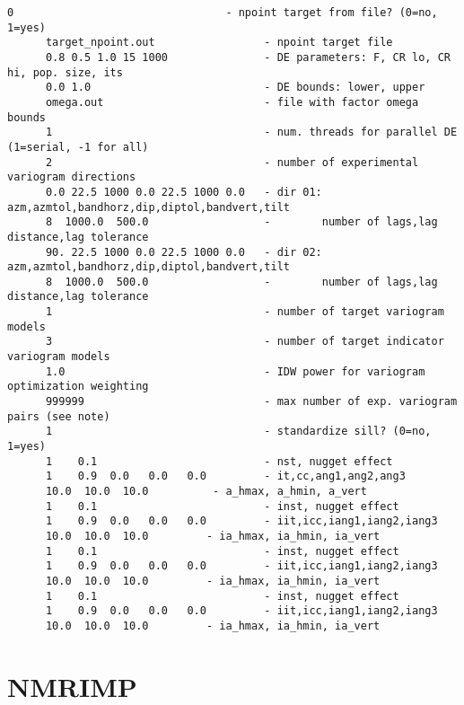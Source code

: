 \begin{framed}
\begin{lstlisting}[style=ccgParameterfile]
      0                                 - npoint target from file? (0=no, 1=yes)
      target_npoint.out                 - npoint target file
      0.8 0.5 1.0 15 1000               - DE parameters: F, CR lo, CR hi, pop. size, its
      0.0 1.0                           - DE bounds: lower, upper
      omega.out                         - file with factor omega bounds
      1                                 - num. threads for parallel DE (1=serial, -1 for all)
      2                                 - number of experimental variogram directions
      0.0 22.5 1000 0.0 22.5 1000 0.0   - dir 01: azm,azmtol,bandhorz,dip,diptol,bandvert,tilt
      8  1000.0  500.0                  -        number of lags,lag distance,lag tolerance
      90. 22.5 1000 0.0 22.5 1000 0.0   - dir 02: azm,azmtol,bandhorz,dip,diptol,bandvert,tilt
      8  1000.0  500.0                  -        number of lags,lag distance,lag tolerance
      1                                 - number of target variogram models
      3                                 - number of target indicator variogram models
      1.0                               - IDW power for variogram optimization weighting
      999999                            - max number of exp. variogram pairs (see note)
      1                                 - standardize sill? (0=no, 1=yes)
      1    0.1                          - nst, nugget effect
      1    0.9  0.0   0.0   0.0         - it,cc,ang1,ang2,ang3
      10.0  10.0  10.0          - a_hmax, a_hmin, a_vert
      1    0.1                          - inst, nugget effect
      1    0.9  0.0   0.0   0.0         - iit,icc,iang1,iang2,iang3
      10.0  10.0  10.0         - ia_hmax, ia_hmin, ia_vert
      1    0.1                          - inst, nugget effect
      1    0.9  0.0   0.0   0.0         - iit,icc,iang1,iang2,iang3
      10.0  10.0  10.0         - ia_hmax, ia_hmin, ia_vert
      1    0.1                          - inst, nugget effect
      1    0.9  0.0   0.0   0.0         - iit,icc,iang1,iang2,iang3
      10.0  10.0  10.0         - ia_hmax, ia_hmin, ia_vert
    \end{lstlisting}
\end{framed}



\FloatBarrier
\section{NMRIMP}
\label{sect:nmrimp}


